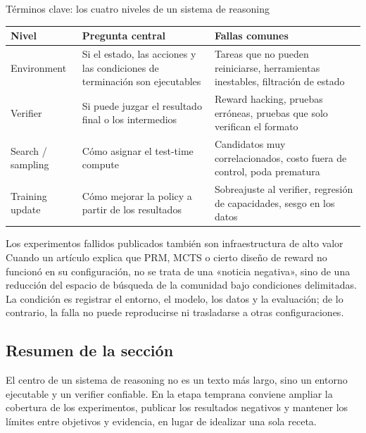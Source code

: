 \documentclass[a4paper]{article}
\begin{document}
\begin{knowledgebox}{Términos clave: los cuatro niveles de un sistema de reasoning}
\begin{tabularx}{\textwidth}{L{0.18\textwidth}X X}
\toprule
Nivel & Pregunta central & Fallas comunes \\
\midrule
Environment & Si el estado, las acciones y las condiciones de terminación son ejecutables & Tareas que no pueden reiniciarse, herramientas inestables, filtración de estado \\
Verifier & Si puede juzgar el resultado final o los intermedios & Reward hacking, pruebas erróneas, pruebas que solo verifican el formato \\
Search / sampling & Cómo asignar el test-time compute & Candidatos muy correlacionados, costo fuera de control, poda prematura \\
Training update & Cómo mejorar la policy a partir de los resultados & Sobreajuste al verifier, regresión de capacidades, sesgo en los datos \\
\bottomrule
\end{tabularx}
\end{knowledgebox}

\begin{warningbox}{Los experimentos fallidos publicados también son infraestructura de alto valor}
Cuando un artículo explica que PRM, MCTS o cierto diseño de reward no funcionó en su configuración, no se trata de una «noticia negativa», sino de una reducción del espacio de búsqueda de la comunidad bajo condiciones delimitadas. La condición es registrar el entorno, el modelo, los datos y la evaluación; de lo contrario, la falla no puede reproducirse ni trasladarse a otras configuraciones.
\end{warningbox}


\subsection{Resumen de la sección}

El centro de un sistema de reasoning no es un texto más largo, sino un entorno ejecutable y un verifier confiable. En la etapa temprana conviene ampliar la cobertura de los experimentos, publicar los resultados negativos y mantener los límites entre objetivos y evidencia, en lugar de idealizar una sola receta.
\end{document}
